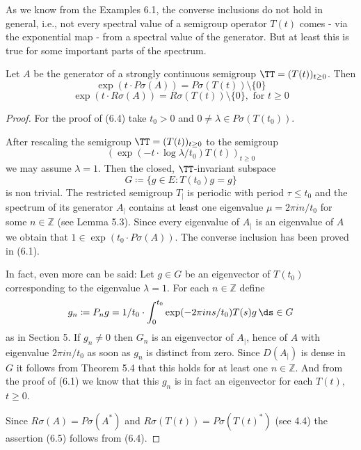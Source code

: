 As we know from the Examples 6.1, the converse inclusions do not hold in general, i.e., not every spectral value of a semigroup operator $T(t)$ comes - via the exponential map - from a spectral value of the generator.
But at least this is true for some important parts of the spectrum.
\begin{theorem}\label{thm:a3-6.3}

Let $A$ be the generator of a strongly continuous semigroup $\TT = (T(t))_{t \geq 0}$.
Then
\begin{equation}\label{eq:a3-6.4}
\exp(t \cdot P\sigma(A)) = P\sigma(T(t)) \setminus \{0\}
\end{equation}
\begin{equation}\label{eq:a3-6.5}
\exp(t \cdot R\sigma(A)) = R\sigma(T(t)) \setminus \{0\}, \text{ for } t \geq 0
\end{equation}
\end{theorem}

\begin{proof}
For the proof of (6.4) take $t_{0} > 0$ and $0 \neq \lambda \in P\sigma(T(t_{0}))$.

After rescaling the semigroup $\TT = (T(t))_{t \geq 0}$ to the semigroup
\[
(\exp(-t \cdot \log\lambda/t_{0})T(t))_{t \geq 0}
\]
 we may assume $\lambda = 1$. Then the closed, $\TT$-invariant subspace
\[
G \coloneqq \{g \in E \colon T(t_{0})g = g\}
\]
is non trivial.
The restricted semigroup $T_{|}$ is periodic with period $\tau \leq t_{0}$ and the spectrum of its generator $A_{|}$ contains at least one eigenvalue $\mu = 2\pi in/t_{0}$ for some $n \in \mathbb{Z}$ (see Lemma 5.3).
Since every eigenvalue of $A_{|}$ is an eigenvalue of $A$ we obtain that $1 \in \exp(t_{0} \cdot P\sigma(A))$.
The converse inclusion has been proved in (6.1).

In fact, even more can be said: Let $g \in G$ be an eigenvector of $T(t_{0})$ corresponding to the eigenvalue $\lambda = 1$.
For each $n \in \mathbb{Z}$ define
\[
g_{n} \coloneqq P_{n}g = 1/t_{0} \cdot \int_{0}^{t_{0}} \exp(-2\pi ins/t_{0})T(s)g \, \ds \in G
\]
as in Section 5.
If $g_{n} \ne 0$ then $G_n$ is an eigenvector of $A_{|}$, hence of $A$ with eigenvalue $2\pi in/t_{0}$ as soon as $g_{n}$ is distinct from zero.
Since $D(A_{|})$ is dense in $G$ it follows from Theorem 5.4 that this holds for at least one $n \in \mathbb{Z}$.
And from the proof of (6.1) we know that this $g_{n}$ is in fact an eigenvector for each $T(t)$, $t \geq 0$.

Since $R\sigma(A) = P\sigma(A^*)$ and $R\sigma(T(t)) = P\sigma(T(t)^*)$ (see 4.4) the assertion (6.5) follows from (6.4).
\end{proof}

